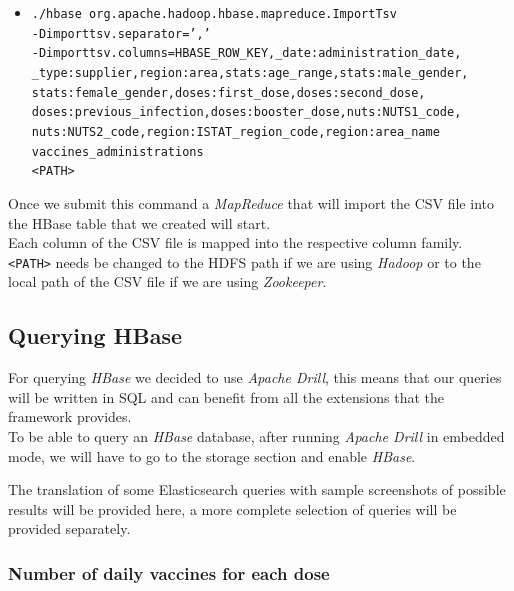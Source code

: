\documentclass[12pt, a4paper]{article}
\begin{document}
\begin{footnotesize}
  \begin{itemize}
    \item[] \texttt{./hbase org.apache.hadoop.hbase.mapreduce.ImportTsv \\
      -Dimporttsv.separator=',' \\
      -Dimporttsv.columns=HBASE\_ROW\_KEY,\_date:administration\_date, \\
        \_type:supplier,region:area,stats:age\_range,stats:male\_gender, \\
        stats:female\_gender,doses:first\_dose,doses:second\_dose, \\
        doses:previous\_infection,doses:booster\_dose,nuts:NUTS1\_code, \\
        nuts:NUTS2\_code,region:ISTAT\_region\_code,region:area\_name \\
      vaccines\_administrations \\
      <PATH>} 
  \end{itemize}
\end{footnotesize}
Once we submit this command a \emph{MapReduce} that will import the CSV file into the 
HBase table that we created will start. \\
Each column of the CSV file is mapped into the respective column family.  \\
\texttt{<PATH>} needs be changed to the HDFS path if we are using \emph{Hadoop} or to 
the local path of the CSV file if we are using \emph{Zookeeper}. 

\subsection{Querying HBase}

For querying \emph{HBase} we decided to use \emph{Apache Drill}, this means that our
queries will be written in SQL and can benefit from all the extensions that the 
framework provides. \\
To be able to query an \emph{HBase} database, after running \emph{Apache Drill} in 
embedded mode, we will have to go to the storage section and enable \emph{HBase}.  

\noindent
The translation of some Elasticsearch queries with sample screenshots of possible results
will be provided here, a more complete selection of queries will be provided separately.

\subsubsection{Number of daily vaccines for each dose}
\end{document}
